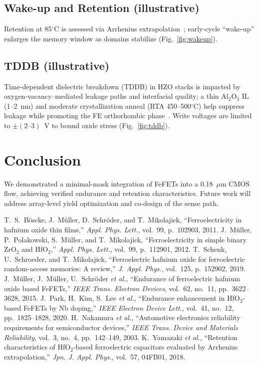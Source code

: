 \documentclass[conference]{IEEEtran}
\begin{document}
\subsection{Wake-up and Retention (illustrative)}
Retention at 85$^\circ$C is assessed via Arrhenius extrapolation~\cite{Yamazaki2018}; early-cycle “wake-up” enlarges the memory window as domains stabilize (Fig.~\ref{fig:wakeup}).

\subsection{TDDB (illustrative)}
Time-dependent dielectric breakdown (TDDB) in HZO stacks is impacted by oxygen-vacancy–mediated leakage paths and interfacial quality; a thin Al$_2$O$_3$ IL (1--2~nm) and moderate crystallization anneal (RTA 450--500$^\circ$C) help suppress leakage while promoting the FE orthorhombic phase~\cite{Mueller2015,Park2020}. Write voltages are limited to $\pm(2\text{--}3)$~V to bound oxide stress (Fig.~\ref{fig:tddb}).

\section{Conclusion}
We demonstrated a minimal-mask integration of FeFETs into a 0.18~$\mu$m CMOS flow, achieving verified endurance and retention characteristics. Future work will address array-level yield optimization and co-design of the sense path.

\begin{thebibliography}{8}
T.~S.~Böscke, J.~Müller, D.~Schröder, and T.~Mikolajick, ``Ferroelectricity in hafnium oxide thin films,'' \emph{Appl. Phys. Lett.}, vol.~99, p.~102903, 2011.
J.~Müller, P.~Polakowski, S.~Müller, and T.~Mikolajick, ``Ferroelectricity in simple binary ZrO$_2$ and HfO$_2$,'' \emph{Appl. Phys. Lett.}, vol.~99, p.~112901, 2012.
T.~Schenk, U.~Schroeder, and T.~Mikolajick, ``Ferroelectric hafnium oxide for ferroelectric random-access memories: A review,'' \emph{J. Appl. Phys.}, vol.~125, p.~152902, 2019.
J.~Müller, J.~Müller, U.~Schröder \emph{et al.}, ``Endurance of ferroelectric hafnium oxide based FeFETs,'' \emph{IEEE Trans. Electron Devices}, vol.~62, no.~11, pp.~3622--3628, 2015.
J.~Park, H.~Kim, S.~Lee \emph{et al.}, ``Endurance enhancement in HfO$_2$-based FeFETs by Nb doping,'' \emph{IEEE Electron Device Lett.}, vol.~41, no.~12, pp.~1825--1828, 2020.
H.~Nakamura \emph{et al.}, ``Automotive electronics reliability requirements for semiconductor devices,'' \emph{IEEE Trans. Device and Materials Reliability}, vol.~3, no.~4, pp.~142--149, 2003.
K.~Yamazaki \emph{et al.}, ``Retention characteristics of HfO$_2$-based ferroelectric capacitors evaluated by Arrhenius extrapolation,'' \emph{Jpn. J. Appl. Phys.}, vol.~57, 04FB01, 2018.
\end{thebibliography}
\end{document}
